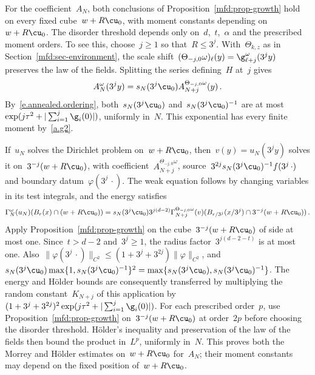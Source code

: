 \documentclass[11pt]{amsart}
\begin{document}
\smallskip

\begin{remark}
\label{mfd:rem-large-cube-growth}
For the coefficient~$A_N$, both conclusions of Proposition~\ref{mfd:prop-growth} hold on every fixed cube~$w+R\cu_0$, with moment constants depending on~$w+R\cu_0$. The disorder threshold depends only on~$d$,~$t$,~$\alpha$ and the prescribed moment orders. To see this, choose~$j\geq1$ so that~$R\leq3^j$. With~$\Theta_{k,z}$ as in Section~\ref{mfd:sec-environment}, the scale shift~$(\Theta_{-j,0}\omega)_\ell(y)=\g_{\ell+j}^\omega(3^jy)$ preserves the law of the fields. Splitting the series defining~$H$ at~$j$ gives
\begin{equation}
	A_N^\omega(3^jy)=s_N(3^j\cu_0)A_{N+j}^{\Theta_{-j,0}\omega}(y)\,.
	\label{eq:mfd-large-cube-transfer}
\end{equation}
By~\eqref{e.annealed.ordering}, both~$s_N(3^j\cu_0)$ and~$s_N(3^j\cu_0)^{-1}$ are at most~$\exp(j\tau^2+|\sum_{i=1}^j\g_i(0)|)$, uniformly in~$N$. This exponential has every finite moment by~\ref{a.g2}.

\smallskip

If~$u_N$ solves the Dirichlet problem on~$w+R\cu_0$, then~$v(y)=u_N(3^jy)$ solves it on~$3^{-j}(w+R\cu_0)$, with coefficient~$A_{N+j}^{\Theta_{-j,0}\omega}$, source~$3^{2j}s_N(3^j\cu_0)^{-1}f(3^j\,\cdot)$ and boundary datum~$\varphi(3^j\,\cdot)$. The weak equation follows by changing variables in its test integrals, and the energy satisfies
\begin{equation*}
	\Gamma_N^\omega(u_N)(B_r(x)\cap(w+R\cu_0))
	=s_N(3^j\cu_0)3^{j(d-2)}
	\Gamma_{N+j}^{\Theta_{-j,0}\omega}(v)
	(B_{r/3^j}(x/3^j)\cap3^{-j}(w+R\cu_0))\,.
\end{equation*}
Apply Proposition~\ref{mfd:prop-growth} on the cube~$3^{-j}(w+R\cu_0)$ of side at most one. Since~$t>d-2$ and~$3^j\geq1$, the radius factor~$3^{j(d-2-t)}$ is at most one. Also~$\|\varphi(3^j\,\cdot)\|_{C^2}\leq(1+3^j+3^{2j})\|\varphi\|_{C^2}$, and~$s_N(3^j\cu_0)\max\{1,s_N(3^j\cu_0)^{-1}\}^2=\max\{s_N(3^j\cu_0),s_N(3^j\cu_0)^{-1}\}$. The energy and H\"older bounds are consequently transferred by multiplying the random constant~$K_{N+j}$ of this application by~$(1+3^j+3^{2j})^2\exp(j\tau^2+|\sum_{i=1}^j\g_i(0)|)$. For each prescribed order~$p$, use Proposition~\ref{mfd:prop-growth} on~$3^{-j}(w+R\cu_0)$ at order~$2p$ before choosing the disorder threshold. H\"older's inequality and preservation of the law of the fields then bound the product in~$L^p$, uniformly in~$N$. This proves both the Morrey and H\"older estimates on~$w+R\cu_0$ for~$A_N$; their moment constants may depend on the fixed position of~$w+R\cu_0$.
\end{remark}
\end{document}
